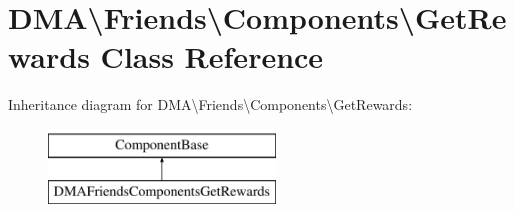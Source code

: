 \hypertarget{classDMA_1_1Friends_1_1Components_1_1GetRewards}{}\section{D\+M\+A\textbackslash{}Friends\textbackslash{}Components\textbackslash{}Get\+Rewards Class Reference}
\label{classDMA_1_1Friends_1_1Components_1_1GetRewards}
Inheritance diagram for D\+M\+A\textbackslash{}Friends\textbackslash{}Components\textbackslash{}Get\+Rewards\+:\begin{figure}[H]
\begin{center}
\leavevmode
\includegraphics[height=2.000000cm]{d7/de7/classDMA_1_1Friends_1_1Components_1_1GetRewards}
\end{center}
\end{figure}
